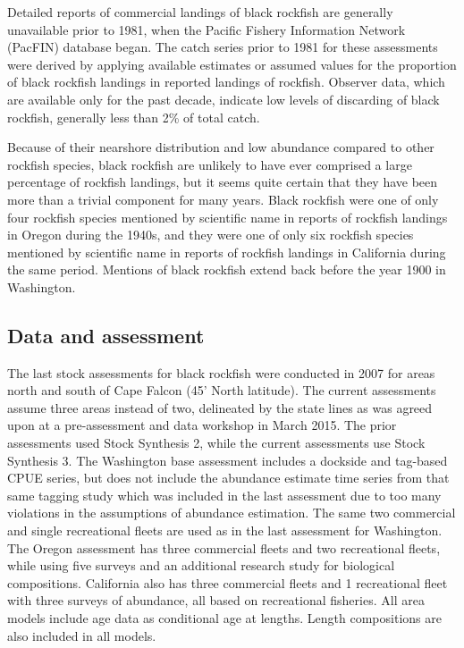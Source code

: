 \documentclass[11pt,
  english,
  letterpaper,
]{article}
\begin{document}
Detailed reports of commercial landings of black rockfish are generally unavailable prior to 1981, when the Pacific Fishery Information Network (PacFIN) database began. The catch series prior to 1981 for these assessments were derived by applying available estimates or assumed values for the proportion of black rockfish landings in reported landings of rockfish. Observer data, which are available only for the past decade, indicate low levels of discarding of black rockfish, generally less than 2\% of total catch.

Because of their nearshore distribution and low abundance compared to other rockfish species, black rockfish are unlikely to have ever comprised a large percentage of rockfish landings, but it seems quite certain that they have been more than a trivial component for many years. Black rockfish were one of only four rockfish species mentioned by scientific name in reports of rockfish landings in Oregon during the 1940s, and they were one of only six rockfish species mentioned by scientific name in reports of rockfish landings in California during the same period. Mentions of black rockfish extend back before the year 1900 in Washington.

\hypertarget{data-and-assessment}{%
\subsection*{Data and assessment}\label{data-and-assessment}}

The last stock assessments for black rockfish were conducted in 2007 for areas north and south of Cape Falcon (45' North latitude). The current assessments assume three areas instead of two, delineated by the state lines as was agreed upon at a pre-assessment and data workshop in March 2015. The prior assessments used Stock Synthesis 2, while the current assessments use Stock Synthesis 3. The Washington base assessment includes a dockside and tag-based CPUE series, but does not include the abundance estimate time series from that same tagging study which was included in the last assessment due to too many violations in the assumptions of abundance estimation. The same two commercial and single recreational fleets are used as in the last assessment for Washington. The Oregon assessment has three commercial fleets and two recreational fleets, while using five surveys and an additional research study for biological compositions. California also has three commercial fleets and 1 recreational fleet with three surveys of abundance, all based on recreational fisheries. All area models include age data as conditional age at lengths. Length compositions are also included in all models.
\end{document}
